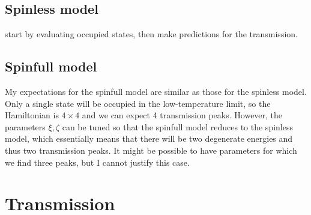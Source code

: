 \subsection{Spinless model}
{\color{red} start by evaluating occupied states, then make predictions for the transmission.}
 
\subsection{Spinfull model}
My expectations for the spinfull model are similar as those for the spinless model. Only a single state will be occupied in the low-temperature limit, so the Hamiltonian is $4\times 4$ and we can expect 4 transmission peaks. However, the parameters $\xi, \zeta$ can be tuned so that the spinfull model reduces to the spinless model, which essentially means that there will be two degenerate energies and thus two transmission peaks. It might be possible to have parameters for which we find three peaks, but I cannot justify this case. 

\section{Transmission}
\label{sec:twositetransmission}

